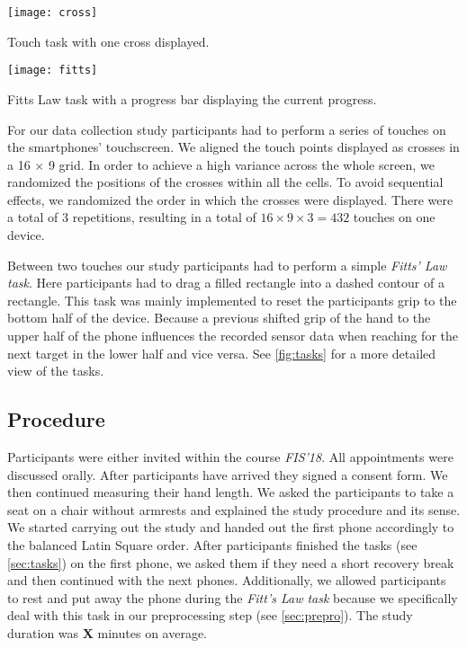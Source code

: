 
\begin{marginfigure}
	\texttt{[image: cross]}
	\caption{Touch task with one cross displayed.\newline}
	\label{fig:touchtask}
\end{marginfigure}

\begin{marginfigure}
	\texttt{[image: fitts]}
	\caption{Fitts Law task with a progress bar displaying the current progress.}
	\label{fig:fittstask}
\end{marginfigure}

For our data collection study participants had to perform a series of touches on the smartphones' touchscreen. 
We aligned the touch points displayed as crosses in a 16 $ \times $ 9 grid. 
In order to achieve a high variance across the whole screen, we randomized the positions of the crosses within all the cells.
To avoid sequential effects, we randomized the order in which the crosses were displayed.
There were a total of 3 repetitions, resulting in a total  of $ 16 \times 9 \times 3 = 432 $ touches on one device.

Between two touches our study participants had to perform a simple \textit{Fitts' Law task}. 
Here participants had to drag a filled rectangle into a dashed contour of a rectangle.
This task was mainly implemented to reset the participants grip to the bottom half of the device.
Because a previous shifted grip of the hand to the upper half of the phone influences the recorded sensor data when reaching for the next target in the lower half and vice versa. 
See \cref{fig:tasks} for a more detailed view of the tasks.
\subsection{Procedure}
Participants were either invited within the course \textit{FIS'18}.
All appointments were discussed orally.
After participants have arrived they signed a consent form. 
We then continued measuring their hand length.
We asked the participants to take a seat on a chair without armrests and explained the study procedure and its sense.
We started carrying out the study and handed out the first phone accordingly to the balanced Latin Square order. 
After participants finished the tasks (see \cref{sec:tasks}) on the first phone, we asked them if they need a short recovery break and then continued with the next phones.
Additionally, we allowed participants to rest and put away the phone during the \textit{Fitt's Law task} because we specifically deal with this task in our preprocessing step (see \cref{sec:prepro}).
The study duration was \textbf{X} minutes on average.
